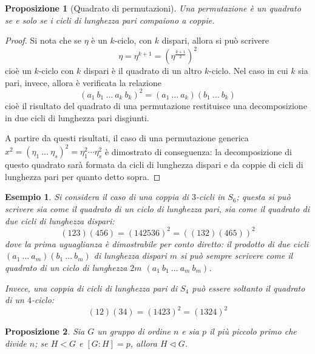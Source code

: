 \documentclass[11pt]{article}
\theoremstyle{style}
\newtheorem{esempio}{Esempio}[section]
\newtheorem{prop}{Proposizione}[section]
\numberwithin{equation}{subsection}
\begin{document}
\begin{prop}[Quadrato di permutazioni]\label{qperm}
	Una permutazione \`e un quadrato se e solo se i cicli di lunghezza pari compaiono a coppie.
\end{prop}
	\begin{proof}
		Si nota che se $\eta$ \`e un $k$-ciclo, con $k$ dispari, allora si pu\`o scrivere
		\[
		\eta = \eta^{k+1} = \left(\eta^{\frac{k+1}{2}}\right) ^2
		\] 
		cio\`e un $k$-ciclo con $k$ dispari \`e il quadrato di un altro $k$-ciclo.
		Nel caso in cui $k$ sia pari, invece, allora \`e verificata la relazione
		\[
			(a_1 \ b_1 \ \ldots \ a_k\ b_k)^2 = (a_1\ \ldots\ a_k) (b_1\ \ldots \ b_k)
		\] 
	cio\`e il risultato del quadrato di una permutazione restituisce una decomposizione in due cicli di lunghezza pari disgiunti.	

	A partire da questi risultati, il caso di una permutazione generica $x^2= (\eta_1 \ \ldots\ \eta_s)^2=\eta_1^2 \cdots \eta_s^2$ \`e dimostrato di conseguenza: la decomposizione di questo quadrato sar\`a formata da cicli di lunghezza dispari e da coppie di cicli di lunghezza pari per quanto detto sopra.
\end{proof}
\begin{esempio}
Si considera il caso di una coppia di $3$-cicli in $S_6$; questa si pu\`o scrivere sia come il quadrato di un ciclo di lunghezza pari, sia come il quadrato di due cicli di lunghezza dispari:
\[
	(123)(456) = (142536)^2 = ((132)(465))^2
\] 
dove la prima uguaglianza \`e dimostrabile per conto diretto: il prodotto di due cicli $(a_1\ \ldots\ a_m)(b_1\ \ldots\ b_m)$ di lunghezza dispari $m$ si pu\`o sempre scrivere come il quadrato di un ciclo di lunghezza $2m$ $(a_1\ b_1\ \ldots\ a_m\ b_m)$.

Invece, una coppia di cicli di lunghezza pari di $S_4$ pu\`o essere soltanto il quadrato di un $4$-ciclo:
\[
	(12)(34) = (1423)^2 = (1324)^2
\] 

\end{esempio}
\begin{prop}\label{propnlag}
	Sia $G$ un gruppo di ordine $n$ e sia $p$ il pi\`u piccolo primo che divide $n$; se $H < G$ e $[G : H ] = p$, allora $H \lhd G$.
\end{prop}
\end{document}
